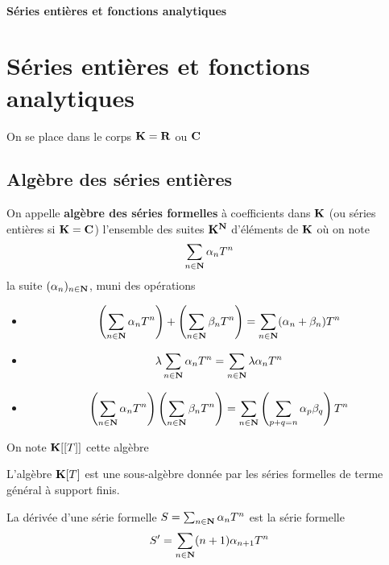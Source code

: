 \ifsolo
    ~

    \vspace{1cm}

    \begin{center}
        \textbf{\LARGE Séries entières et fonctions analytiques} \\[1em]
    \end{center}
    \tableofcontents
\else
    \chapter{Séries entières et fonctions analytiques}

    \minitoc
\fi
\thispagestyle{empty}

On se place dans le corps $\mathbf K=\mathbf R$ ou $\mathbf C$

\section{Algèbre des séries entières}

\begin{dfn}
    On appelle \textbf{algèbre des séries formelles} à coefficients dans $\mathbf K$ (ou séries entières si $\mathbf K=\mathbf C$) l'ensemble des suites $\mathbf K^\mathbf N$ d'éléments de $\mathbf K$ où on note \[
    \sum_{n \in  \mathbf N}\alpha_n T^n
    \] 
    la suite $(\alpha_n)_{n \in  \mathbf N}$, muni des opérations \begin{itemize}
        \item \[
                \left( \sum_{n \in  \mathbf N}\alpha_nT^n \right) + \left( \sum_{n\in \mathbf N} \beta_n T^n \right)= \sum_{n \in  \mathbf N} (\alpha_n+\beta_n)T^n
        \] 
        \item \[
        \lambda \sum_{n \in  \mathbf N} \alpha_nT^n=\sum_{n \in  \mathbf N} \lambda \alpha_n T^n
        \] 
        \item \[
                \left( \sum_{n \in  \mathbf N} \alpha_nT^n \right) \left( \sum_{n \in  \mathbf N} \beta_nT^n \right)= \sum_{n \in  \mathbf N} \left( \sum_{p+q=n} \alpha_p\beta_q \right)T^n
        \] 
    \end{itemize}
    On note $\mathbf K [ [T]] $ cette algèbre
\end{dfn}

\begin{rem}
    L'algèbre $\mathbf K[T]$ est une sous-algèbre donnée par les séries formelles de terme général à support finis.
\end{rem}

\begin{dfn}
    La dérivée d'une série formelle $S=\sum_{n \in \mathbf N} \alpha_{n} T^{n}$ est la série formelle
\[
S'=\sum_{n \in \mathbf N}(n+1) \alpha_{n+1} T^{n}
\]
\end{dfn}

